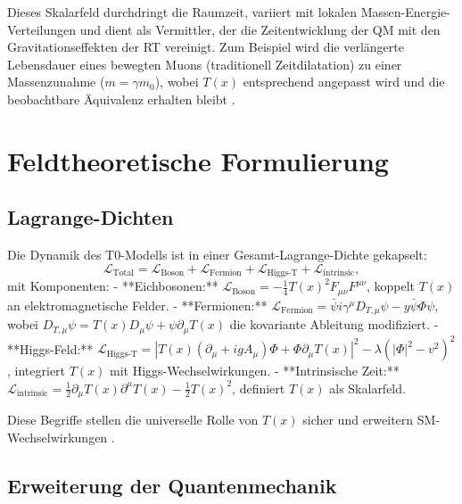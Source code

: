 \documentclass[12pt,a4paper]{article}
\newcommand{\Tfield}{T(x)}
\newcommand{\DhiggsT}{\Tfield (\partial_\mu + ig A_\mu) \Phi + \Phi \partial_\mu \Tfield}
\newcommand{\DTmu}{D_{T,\mu}}
\newcommand{\calL}{\mathcal{L}}
\begin{document}
	Dieses Skalarfeld durchdringt die Raumzeit, variiert mit lokalen Massen-Energie-Verteilungen und dient als Vermittler, der die Zeitentwicklung der QM mit den Gravitationseffekten der RT vereinigt. Zum Beispiel wird die verlängerte Lebensdauer eines bewegten Muons (traditionell Zeitdilatation) zu einer Massenzunahme (\(m = \gamma m_0\)), wobei \(\Tfield\) entsprechend angepasst wird und die beobachtbare Äquivalenz erhalten bleibt \cite{pascher_quantum_2025}.
	
	\section{Feldtheoretische Formulierung}
	\label{sec:field_theory}
	
	\subsection{Lagrange-Dichten}
	\label{subsec:lagrangian}
	
	Die Dynamik des T0-Modells ist in einer Gesamt-Lagrange-Dichte gekapselt:
	\begin{equation}
		\calL_{\text{Total}} = \calL_{\text{Boson}} + \calL_{\text{Fermion}} + \calL_{\text{Higgs-T}} + \calL_{\text{intrinsic}},
		\label{eq:total_lagrangian}
	\end{equation}
	mit Komponenten:
	- **Eichbosonen:** \(\calL_{\text{Boson}} = -\frac{1}{4}\Tfield^2 F_{\mu\nu}F^{\mu\nu}\), koppelt \(\Tfield\) an elektromagnetische Felder.
	- **Fermionen:** \(\calL_{\text{Fermion}} = \bar{\psi}i\gamma^{\mu}\DTmu\psi - y\bar{\psi}\Phi\psi\), wobei \(\DTmu\psi = \Tfield D_{\mu}\psi + \psi\partial_{\mu}\Tfield\) die kovariante Ableitung modifiziert.
	- **Higgs-Feld:** \(\calL_{\text{Higgs-T}} = |\DhiggsT|^2 - \lambda(|\Phi|^2 - v^2)^2\), integriert \(\Tfield\) mit Higgs-Wechselwirkungen.
	- **Intrinsische Zeit:** \(\calL_{\text{intrinsic}} = \frac{1}{2}\partial_{\mu}\Tfield\partial^{\mu}\Tfield - \frac{1}{2}\Tfield^2\), definiert \(\Tfield\) als Skalarfeld.
	
	Diese Begriffe stellen die universelle Rolle von \(\Tfield\) sicher und erweitern SM-Wechselwirkungen \cite{pascher_lagrange_2025}.
	
	\subsection{Erweiterung der Quantenmechanik}
	\label{subsec:qm_extension}
	
\end{document}
